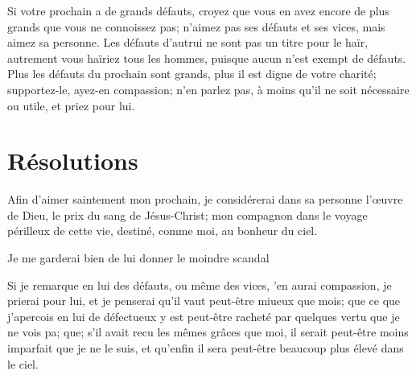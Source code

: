 \documentclass[instructions.tex]{subfiles}
\begin{document}
Si votre prochain a de grands défauts, croyez que vous en avez encore de plus grands que vous ne connoissez pas; n’aimez pas ses défauts et ses vices, mais aimez sa personne. Les défauts d’autrui ne sont pas un titre pour le haïr, autrement vous haïriez tous les hommes, puisque aucun n’est exempt de défauts. Plus les défauts du prochain sont grands, plus il est digne de votre charité; supportez-le, ayez-en compassion; n’en parlez pas, à moins qu’il ne soit nécessaire ou utile, et priez pour lui.
 
\section{Résolutions}
 
\primo Afin d’aimer saintement mon prochain, je considérerai dans sa personne l’œuvre de Dieu, le prix du sang de Jésus-Christ; mon compagnon dans le voyage périlleux de cette vie, destiné, comme moi, au bonheur du ciel. 

\secundo Je me garderai bien de lui donner le moindre scandal

\tertio Si je remarque en lui des défauts, ou même des vices, 'en aurai compassion, je prierai pour lui, et je penserai qu'il vaut peut-être miueux que mois; que ce que j'apercois en lui de défectueux y est peut-être racheté par quelques vertu que je ne vois pa; que; s'il avait recu les mêmes grâces que moi, il serait peut-être moins imparfait que je ne le suis, et qu'enfin il sera peut-être beaucoup plus élevé dans le ciel. 

\end{document}
